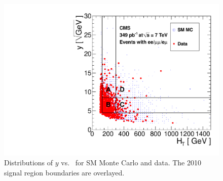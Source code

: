 \begin{figure}[tbh]
\begin{center}
\includegraphics[width=0.6\linewidth]{plots/abcd_349pb.pdf}
\caption{\label{fig:abcdData1}\protect Distributions of $y$ 
vs. \Ht\ for SM Monte Carlo and data. The 2010 signal region boundaries are overlayed.}
\end{center}
\end{figure}

